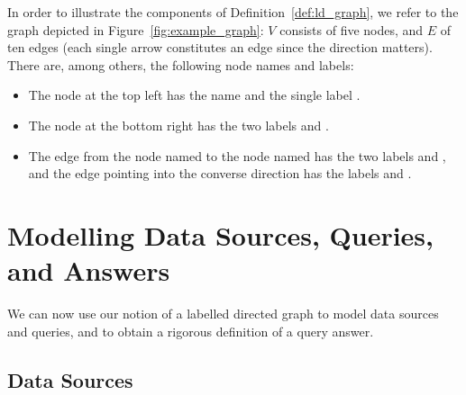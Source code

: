 In order to illustrate the components of Definition~\ref{def:ld_graph},
we refer to the graph depicted in Figure~\ref{fig:example_graph}:
$V$ consists of five nodes, and $E$ of ten edges
(each single arrow constitutes an edge since the direction matters).
There are, among others, the following node names and labels:
%
\begin{itemize}
  \item
    The node at the top left has the name 
    and the single label .
  \item 
    The node at the bottom right has the two labels  and .
  \item 
    The edge from the node named  to the node named 
    has the two labels  and ,
    and the edge pointing into the converse direction has the labels
     and .
\end{itemize}
%

\section{Modelling Data Sources, Queries, and Answers}
\label{sec:modelling}

We can now use our notion of a labelled directed graph to model
data sources and queries, and to obtain a rigorous definition of a query answer.

\subsection{Data Sources}


